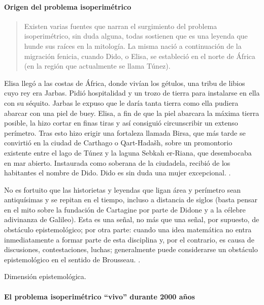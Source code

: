\paragraph{Origen del problema isoperimétrico}

\begin{quote}
	Existen varias fuentes que narran el surgimiento del problema isoperimétrico, sin duda alguna, todas sostienen que es una leyenda que hunde sus raíces en la mitología. La misma nació a continuación de la migración fenicia, cuando Dido, o Elisa, se estableció en el norte de África (en la región que actualmente se llama Túnez).
\end{quote}
\vspace{1em}

Elisa llegó a las costas de África, donde vivían los gétulos, una tribu de libios cuyo rey era Jarbas. Pidió hospitalidad y un trozo de tierra para instalarse en ella con su séquito. Jarbas le expuso que le daría tanta tierra como ella pudiera abarcar con una piel de buey. Elisa, a fin de que la piel abarcara la máxima tierra posible, la hizo cortar en finas tiras y así consiguió circunscribir un extenso perímetro. Tras esto hizo erigir una fortaleza llamada Birsa, que más tarde se convirtió en la ciudad de Carthago o Qart-Hadašh, sobre un promontorio existente entre el lago de Túnez y la laguna Sebkah er-Riana, que desembocaba en mar abierto. Instaurada como soberana de la ciudadela, recibió de los habitantes el nombre de Dido. Dido es sin duda una mujer excepcional. \textcite{arguedas2013}.

No es fortuito que las historietas y leyendas que ligan área y perímetro sean antiquísimas y se repitan en el tiempo, incluso a distancia de siglos (basta pensar en el mito sobre la fundación de Cartagine por parte de Didone y a la célebre adivinanza de Galileo). Esta es una señal, no más que una señal, por supuesto, de obstáculo epistemológico; por otra parte: cuando una idea matemática no entra inmediatamente a formar parte de esta disciplina y, por el contrario, es causa de discusiones, contestaciones, luchas; generalmente puede considerarse un obstáculo epistemológico en el sentido de Brousseau. \textcite{damore2007}.

Dimensión epistemológica.

\paragraph{El problema isoperimétrico “vivo” durante 2000 años}

